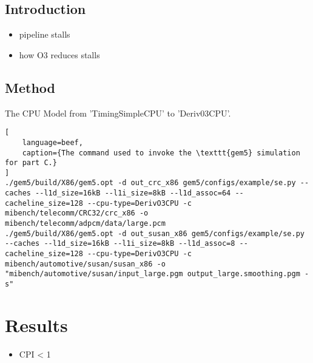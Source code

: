 %
%



\subsection{Introduction}

\begin{itemize}
\item pipeline stalls
\item how O3 reduces stalls
\end{itemize}


\subsection{Method}

The CPU Model from 'TimingSimpleCPU' to 'Deriv03CPU'.

\begin{lstlisting}[
    language=beef,
    caption={The command used to invoke the \texttt{gem5} simulation for part C.}
]
./gem5/build/X86/gem5.opt -d out_crc_x86 gem5/configs/example/se.py --caches --l1d_size=16kB --l1i_size=8kB --l1d_assoc=64 --cacheline_size=128 --cpu-type=DerivO3CPU -c mibench/telecomm/CRC32/crc_x86 -o mibench/telecomm/adpcm/data/large.pcm
./gem5/build/X86/gem5.opt -d out_susan_x86 gem5/configs/example/se.py --caches --l1d_size=16kB --l1i_size=8kB --l1d_assoc=8 --cacheline_size=128 --cpu-type=DerivO3CPU -c mibench/automotive/susan/susan_x86 -o "mibench/automotive/susan/input_large.pgm output_large.smoothing.pgm -s"
\end{lstlisting}


\section{Results}

\begin{itemize}
\item CPI < 1
\end{itemize}


%    
